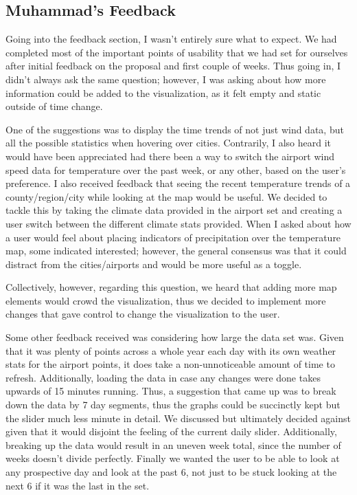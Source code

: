 \documentclass[9pt,twocolumn,twoside]{opticajnl}
\begin{document}
\subsection{Muhammad's Feedback}
Going into the feedback section, I wasn't entirely sure what to expect. We had completed most of the important points of usability that we had set for ourselves after initial feedback on the proposal and first couple of weeks. Thus going in, I didn't always ask the same question; however, I was asking about how more information could be added to the visualization, as it felt empty and static outside of time change. 

One of the suggestions was to display the time trends of not just wind data, but all the possible statistics when hovering over cities. Contrarily, I also heard it would have been appreciated had there been a way to switch the airport wind speed data for temperature over the past week, or any other, based on the user's preference. I also received feedback that seeing the recent temperature trends of a county/region/city while looking at the map would be useful. We decided to tackle this by taking the climate data provided in the airport set and creating a user switch between the different climate stats provided. When I asked about how a user would feel about placing indicators of precipitation over the temperature map, some indicated interested; however, the general consensus was that it could distract from the cities/airports and would be more useful as a toggle.

Collectively, however, regarding this question, we heard that adding more map elements would crowd the visualization, thus we decided to implement more changes that gave control to change the visualization to the user.

Some other feedback received was considering how large the data set was. Given that it was plenty of points across a whole year each day with its own weather stats for the airport points, it does take a non-unnoticeable amount of time to refresh. Additionally, loading the data in case any changes were done takes upwards of 15 minutes running. Thus, a suggestion that came up was to break down the data by 7 day segments, thus the graphs could be succinctly kept but the slider much less minute in detail. We discussed but ultimately decided against given that it would disjoint the feeling of the current daily slider. Additionally, breaking up the data would result in an uneven week total, since the number of weeks doesn't divide perfectly. Finally we wanted the user to be able to look at any prospective day and look at the past 6, not just to be stuck looking at the next 6 if it was the last in the set.
\end{document}
